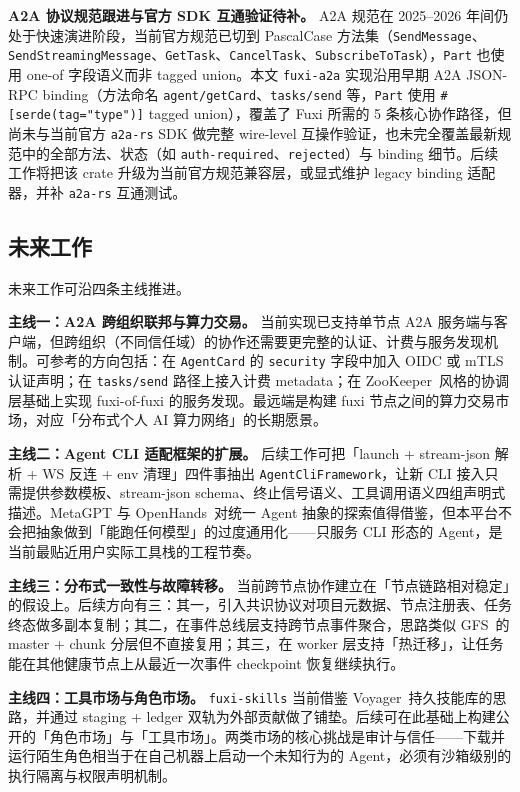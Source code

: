 \textbf{A2A 协议规范跟进与官方 SDK 互通验证待补。} A2A 规范在 2025--2026 年间仍处于快速演进阶段，当前官方规范已切到 PascalCase 方法集（\texttt{SendMessage}、\texttt{SendStreamingMessage}、\texttt{GetTask}、\texttt{CancelTask}、\texttt{SubscribeToTask}），\texttt{Part} 也使用 one-of 字段语义而非 tagged union。本文 \texttt{fuxi-a2a} 实现沿用早期 A2A JSON-RPC binding（方法命名 \texttt{agent/getCard}、\texttt{tasks/send} 等，\texttt{Part} 使用 \texttt{\#[serde(tag="type")]} tagged union），覆盖了 Fuxi 所需的 5 条核心协作路径，但尚未与当前官方 \texttt{a2a-rs} SDK 做完整 wire-level 互操作验证，也未完全覆盖最新规范中的全部方法、状态（如 \texttt{auth-required}、\texttt{rejected}）与 binding 细节。后续工作将把该 crate 升级为当前官方规范兼容层，或显式维护 legacy binding 适配器，并补 \texttt{a2a-rs} 互通测试。

\subsection{未来工作}
\label{subsec:future-work}

未来工作可沿四条主线推进。

\textbf{主线一：A2A 跨组织联邦与算力交易。} 当前实现已支持单节点 A2A 服务端与客户端，但跨组织（不同信任域）的协作还需要更完整的认证、计费与服务发现机制。可参考的方向包括：在 \texttt{AgentCard} 的 \texttt{security} 字段中加入 OIDC 或 mTLS 认证声明；在 \texttt{tasks/send} 路径上接入计费 metadata；在 ZooKeeper~\parencite{hunt2010zookeeper}风格的协调层基础上实现 fuxi-of-fuxi 的服务发现。最远端是构建 fuxi 节点之间的算力交易市场，对应「分布式个人 AI 算力网络」的长期愿景。

\textbf{主线二：Agent CLI 适配框架的扩展。} 后续工作可把「launch + stream-json 解析 + WS 反连 + env 清理」四件事抽出 \texttt{AgentCliFramework}，让新 CLI 接入只需提供参数模板、stream-json schema、终止信号语义、工具调用语义四组声明式描述。MetaGPT 与 OpenHands~\parencite{wang2024openhands}对统一 Agent 抽象的探索值得借鉴，但本平台不会把抽象做到「能跑任何模型」的过度通用化——只服务 CLI 形态的 Agent，是当前最贴近用户实际工具栈的工程节奏。

\textbf{主线三：分布式一致性与故障转移。} 当前跨节点协作建立在「节点链路相对稳定」的假设上。后续方向有三：其一，引入共识协议对项目元数据、节点注册表、任务终态做多副本复制；其二，在事件总线层支持跨节点事件聚合，思路类似 GFS~\parencite{ghemawat2003gfs}的 master + chunk 分层但不直接复用；其三，在 worker 层支持「热迁移」，让任务能在其他健康节点上从最近一次事件 checkpoint 恢复继续执行。

\textbf{主线四：工具市场与角色市场。} \texttt{fuxi-skills} 当前借鉴 Voyager~\parencite{wang2023voyager}持久技能库的思路，并通过 staging + ledger 双轨为外部贡献做了铺垫。后续可在此基础上构建公开的「角色市场」与「工具市场」。两类市场的核心挑战是审计与信任——下载并运行陌生角色相当于在自己机器上启动一个未知行为的 Agent，必须有沙箱级别的执行隔离与权限声明机制。

